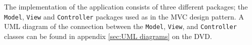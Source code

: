 The implementation of the application consists of three different packages; the \texttt{Model}, \texttt{View} and \texttt{Controller} packages used as in the MVC design pattern. A UML diagram of the connection between the \texttt{Model}, \texttt{View}, and \texttt{Controller} classes can be found in appendix \ref{sec:UML diagrams} on the DVD.
